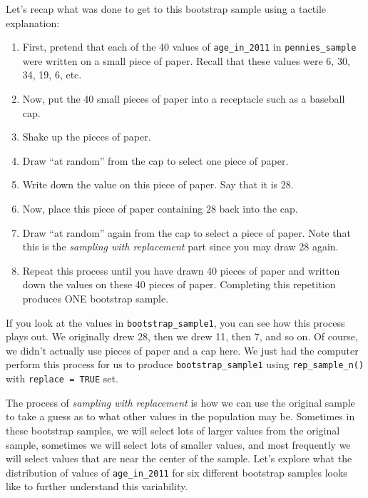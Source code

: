 \documentclass[12pt, krantz2,]{krantz}
\makeatletter
\newenvironment{Shaded}{\begin{snugshade}}{\end{snugshade}}
\newcommand{\DataTypeTok}[1]{\textcolor[rgb]{0.27,0.27,0.27}{#1}}
\newcommand{\DecValTok}[1]{\textcolor[rgb]{0.06,0.06,0.06}{#1}}
\newcommand{\KeywordTok}[1]{\textcolor[rgb]{0.27,0.27,0.27}{\textbf{#1}}}
\newcommand{\NormalTok}[1]{#1}
\newcommand{\OperatorTok}[1]{\textcolor[rgb]{0.43,0.43,0.43}{\textbf{#1}}}
\newcommand{\OtherTok}[1]{\textcolor[rgb]{0.37,0.37,0.37}{#1}}
\newcommand{\StringTok}[1]{\textcolor[rgb]{0.5,0.5,0.5}{#1}}
\providecommand{\tightlist}{%
  \setlength{\itemsep}{0pt}\setlength{\parskip}{0pt}}
\newenvironment{kframe}{%
\medskip{}
\setlength{\fboxsep}{.8em}
 \def\at@end@of@kframe{}%
 \ifinner\ifhmode%
  \def\at@end@of@kframe{\end{minipage}}%
  \begin{minipage}{\columnwidth}%
 \fi\fi%
 \def\FrameCommand##1{\hskip\@totalleftmargin \hskip-\fboxsep
 \colorbox{shadecolor}{##1}\hskip-\fboxsep
     \hskip-\linewidth \hskip-\@totalleftmargin \hskip\columnwidth}%
 \MakeFramed {\advance\hsize-\width
   \@totalleftmargin\z@ \linewidth\hsize
   \@setminipage}}%
 {\par\unskip\endMakeFramed%
 \at@end@of@kframe}
\renewenvironment{Shaded}{\begin{kframe}}{\end{kframe}}
\makeatother
\begin{document}
Let's recap what was done to get to this bootstrap sample using a tactile explanation:

\begin{enumerate}
\def\labelenumi{\arabic{enumi}.}
\tightlist
\item
  First, pretend that each of the 40 values of \texttt{age\_in\_2011} in \texttt{pennies\_sample} were written on a small piece of paper. Recall that these values were 6, 30, 34, 19, 6, etc.
\item
  Now, put the 40 small pieces of paper into a receptacle such as a baseball cap.
\item
  Shake up the pieces of paper.
\item
  Draw ``at random'' from the cap to select one piece of paper.
\item
  Write down the value on this piece of paper. Say that it is 28.
\item
  Now, place this piece of paper containing 28 back into the cap.
\item
  Draw ``at random'' again from the cap to select a piece of paper. Note that this is the \emph{sampling with replacement} part since you may draw 28 again.
\item
  Repeat this process until you have drawn 40 pieces of paper and written down the values on these 40 pieces of paper. Completing this repetition produces ONE bootstrap sample.
\end{enumerate}

If you look at the values in \texttt{bootstrap\_sample1}, you can see how this process plays out. We originally drew 28, then we drew 11, then 7, and so on. Of course, we didn't actually use pieces of paper and a cap here. We just had the computer perform this process for us to produce \texttt{bootstrap\_sample1} using \texttt{rep\_sample\_n()} with \texttt{replace\ =\ TRUE} set.

The process of \emph{sampling with replacement} is how we can use the original sample to take a guess as to what other values in the population may be. Sometimes in these bootstrap samples, we will select lots of larger values from the original sample, sometimes we will select lots of smaller values, and most frequently we will select values that are near the center of the sample. Let's explore what the distribution of values of \texttt{age\_in\_2011} for six different bootstrap samples looks like to further understand this variability.

\begin{Shaded}
\end{Shaded}
\end{document}
